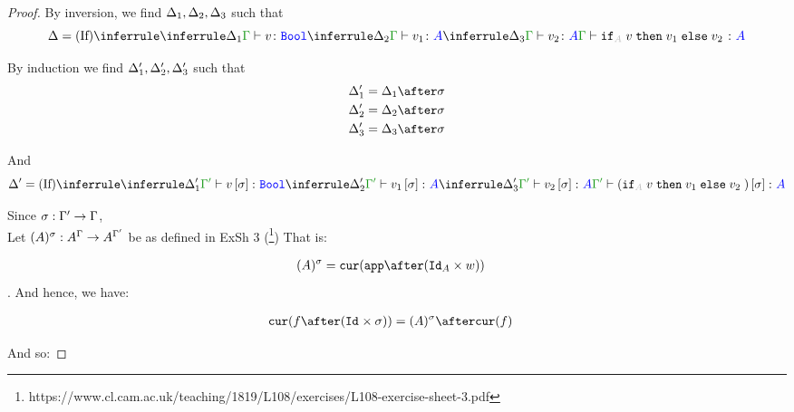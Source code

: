\documentclass{report}
\begin{document}
\begin{framed}
\begin{proof}
        
        
        By inversion, we find $\Delta_1, \Delta_2, \Delta_3$ such that
        \begin{equation}
            \D = \ntreeruleIII{If}{\treeruleI{\D_1}{\typerelation{\G}{v}{\B}}}{\treeruleI{\D_2}{\typerelation{\G}{v_1}{ A}}}{\treeruleI{\D_3}{\typerelation{\G}{v_2}{ A}}}{\typerelation{\G}{\pifthenelse{A}{v}{v_1}{v_2}}{ A}}
        \end{equation}
        
        By induction we find $\Delta_1', \Delta_2', \Delta_3'$ such that 
        \begin{align*}
            \D_1' &= \D_1\after\si\\
            \D_2' &= \D_2\after\si\\
            \D_3' &= \D_3\after\si\\
        \end{align*}
        
        And
        \begin{equation}
            \D' = \ntreeruleIII{If}{\treeruleI{\D_1'}{\typerelation{\G'}{v\ssi}{\B}}}{\treeruleI{\D_2'}{\typerelation{\G'}{v_1\ssi}{ A}}}{\treeruleI{\D_3'}{\typerelation{\G'}{v_2\ssi}{ A}}}{\typerelation{\G'}{(\pifthenelse{A}{v}{v_1}{v_2})\ssi}{ A}}
        \end{equation}
        
        Since $\sigma: \Gamma' \rightarrow \Gamma$, \\
        Let $(A)^{\sigma}: A^{\Gamma}\rightarrow A^{\Gamma'}$ be as defined in ExSh 3 (\footnote{https://www.cl.cam.ac.uk/teaching/1819/L108/exercises/L108-exercise-sheet-3.pdf})
        That is:
        
        \begin{align*}
            ( A)^{\si} & = \cur{\app\after(\Id{ A}\times w)}
        \end{align*}.
        And hence, we have:
        
        \begin{align*}
            \cur{f\after(\Id{}\times \si)} & = ( A)^{\si} \after\cur{f}
        \end{align*}
        
        And so:
        

\end{proof}
\end{framed}
\end{document}
